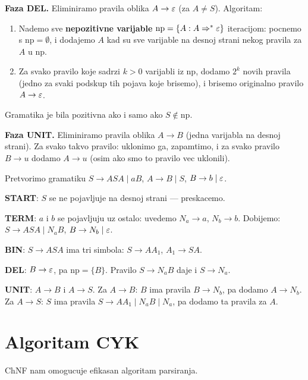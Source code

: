 \medskip
\noindent\textbf{Faza DEL.}
Eliminiramo pravila oblika $A \to \varepsilon$ (za $A \neq S$).
Algoritam:
\begin{enumerate}
  \item Nademo sve \textbf{nepozitivne varijable} $\mathrm{np} = \{A : A \Rightarrow^* \varepsilon\}$
        iteracijom: pocnemo s $\mathrm{np} = \emptyset$, i dodajemo $A$
        kad su sve varijable na desnoj strani nekog pravila za $A$ u $\mathrm{np}$.
  \item Za svako pravilo koje sadrzi $k > 0$ varijabli iz $\mathrm{np}$,
        dodamo $2^k$ novih pravila (jedno za svaki podskup tih pojava
        koje brisemo), i brisemo originalno pravilo $A \to \varepsilon$.
\end{enumerate}
Gramatika je bila pozitivna ako i samo ako $S \notin \mathrm{np}$.

\medskip
\noindent\textbf{Faza UNIT.}
Eliminiramo pravila oblika $A \to B$ (jedna varijabla na desnoj strani).
Za svako takvo pravilo: uklonimo ga, zapamtimo, i za svako pravilo
$B \to u$ dodamo $A \to u$ (osim ako smo to pravilo vec uklonili).

\begin{primjer}
Pretvorimo gramatiku $S \to ASA \mid aB$, $A \to B \mid S$, $B \to b \mid \varepsilon$.

\textbf{START}: $S$ se ne pojavljuje na desnoj strani --- preskacemo.

\textbf{TERM}: $a$ i $b$ se pojavljuju uz ostalo: uvedemo $N_a \to a$, $N_b \to b$.
Dobijemo: $S \to ASA \mid N_a B$, $B \to N_b \mid \varepsilon$.

\textbf{BIN}: $S \to ASA$ ima tri simbola: $S \to A A_1$, $A_1 \to SA$.

\textbf{DEL}: $B \to \varepsilon$, pa $\mathrm{np} = \{B\}$.
Pravilo $S \to N_a B$ daje i $S \to N_a$.

\textbf{UNIT}: $A \to B$ i $A \to S$. Za $A \to B$: $B$ ima pravila
$B \to N_b$, pa dodamo $A \to N_b$. Za $A \to S$: $S$ ima pravila
$S \to A A_1 \mid N_a B \mid N_a$, pa dodamo ta pravila za $A$.
\end{primjer}

\section{Algoritam CYK}

ChNF nam omogucuje efikasan algoritam parsiranja.

